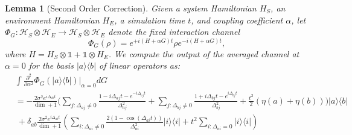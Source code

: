 \documentclass{article}
\newtheorem{lemma}[theorem]{Lemma}
\newcommand{\ketbra}[2]{| #1\rangle\! \langle #2|}
\newcommand{\parens}[1]{\left( #1 \right)}
\newcommand{\hilb}{\mathcal{H}}
\newcommand{\identity}{\mathds{1}}
\begin{document}
\begin{lemma}[Second Order Correction] \label{lem:the_double_duhamel}
    Given a system Hamiltonian $H_{S}$, an environment Hamiltonian $H_{E}$, a simulation time $t$, and coupling coefficient $\alpha$, let $\Phi_G : \hilb_S \otimes \hilb_E \to \hilb_S \otimes \hilb_E$ denote the fixed interaction channel 
    \begin{equation}
        \Phi_G(\rho) = e^{+i (H + \alpha G)t} \rho e^{-i (H + \alpha G)t},
    \end{equation}
    where $H = H_S \otimes \identity + \identity \otimes H_E$. We compute the output of the averaged channel at $\alpha = 0$ for the basis $\ketbra{a}{b}$ of linear operators as:
 \begin{align}
     &\int \frac{\partial^2}{\partial \alpha^2} \Phi_G(\ketbra{a}{b})\bigg|_{\alpha = 0} dG \\
     &= -\frac{2 \sigma^2 e^{i \Delta_{ab} t}}{\dim + 1} \bigg(\sum_{j: \Delta_{aj} \neq 0} \frac{1 - i \Delta_{aj}t - e^{-i \Delta_{aj} t}}{\Delta_{aj}^2} + \sum_{j: \Delta_{bj} \neq 0} \frac{1 + i \Delta_{bj} t - e^{i \Delta_{bj} t}}{\Delta_{bj}^2} + \frac{t^2}{2}(\eta(a) + \eta(b)) \bigg) \ketbra{a}{b} \nonumber \\
    &~ +\delta_{ab} \frac{2\sigma^2 e^{i \Delta_{ab}t}}{\dim+1} \parens{ \sum_{i: \Delta_{ai} \neq 0 } \frac{2(1- \cos (\Delta_{ai}t))}{\Delta_{ai}^2} \ketbra{i}{i} + t^2 \sum_{i : \Delta_{ai} = 0} \ketbra{i}{i}}
 \end{align}
\end{lemma}
\end{document}

